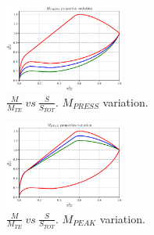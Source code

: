 \documentclass[11pt,a4paper,twocolumn]{article}
\newcommand\width{0.35}
\begin{document}
\begin{figure}[!h]
    \centering
    \includegraphics[width=\width\textwidth]{pyFigure/figures/load-MPRESS.eps}
    \caption{$\frac{M}{M_{TE}} \ vs \ \frac{S}{S_{TOT}}$. $M_{PRESS}$ variation.}    
    \label{fig:MPRESS}
\end{figure}

\begin{figure}[!h]
    \centering
    \includegraphics[width=\width\textwidth]{pyFigure/figures/load-MPEAK.eps}
    \caption{$\frac{M}{M_{TE}} \ vs \ \frac{S}{S_{TOT}}$. $M_{PEAK}$ variation.}    
    \label{fig:MPEAK}
\end{figure}
\end{document}
